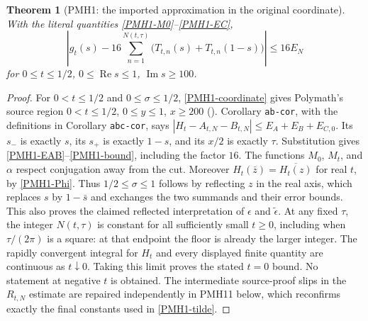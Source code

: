 \documentclass[11pt]{article}
\newtheorem{theorem}{Theorem}
\newcommand{\Rea}{\operatorname{Re}}
\newcommand{\Ima}{\operatorname{Im}}
\newcommand{\Src}[1]{\cite[original TeX label \texttt{#1}]{polymath}}
\begin{document}
\begin{theorem}[PMH1: the imported approximation in the original coordinate]
\label{PMH1}
With the literal quantities \eqref{PMH1-M0}--\eqref{PMH1-EC},
\begin{equation}\label{PMH1-bound}
 \left|g_t(s)-16\sum_{n=1}^{N(t,\tau)}
       \bigl(T_{t,n}(s)+T_{t,n}(1-s)\bigr)\right|\le16E_N
\end{equation}
for $0\le t\le1/2$, $0\le\Rea s\le1$, $\Ima s\ge100$.
\end{theorem}
\begin{proof}
For $0<t\le1/2$ and $0\le\sigma\le1/2$,
\eqref{PMH1-coordinate} gives Polymath's source region
$0<t\le1/2$, $0\le y\le1$, $x\ge200$ (\Src{region}).
Corollary \texttt{ab-cor}, with the definitions in
Corollary \texttt{abc-cor}, says
$|H_t-A_{t,N}-B_{t,N}|\le E_A+E_B+E_{C,0}$.
Its $s_-$ is exactly $s$, its $s_+$ is exactly $1-s$, and its
$x/2$ is exactly $\tau$. Substitution gives
\eqref{PMH1-EAB}--\eqref{PMH1-bound}, including the factor $16$.
The functions $M_0$, $M_t$, and $\alpha$ respect conjugation away
from the cut. Moreover $H_t(\bar z)=\overline{H_t(z)}$ for real $t$,
by \eqref{PMH1-Phi}. Thus $1/2\le\sigma\le1$ follows by reflecting
$z$ in the real axis, which replaces $s$ by $1-\bar s$ and exchanges
the two summands and their error bounds. This also proves the claimed
reflected interpretation of $\epsilon$ and $\widetilde\epsilon$.
At any fixed $\tau$, the integer $N(t,\tau)$ is constant for all
sufficiently small $t\ge0$, including when $\tau/(2\pi)$ is a square:
at that endpoint the floor is already the larger integer.
The rapidly convergent integral for $H_t$ and every displayed finite
quantity are continuous as $t\downarrow0$. Taking this limit proves
the stated $t=0$ bound. No statement at negative $t$ is obtained.
The intermediate source-proof slips in the $R_{t,N}$ estimate are
repaired independently in PMH11 below, which reconfirms exactly
the final constants used in \eqref{PMH1-tilde}.
\end{proof}
\end{document}
